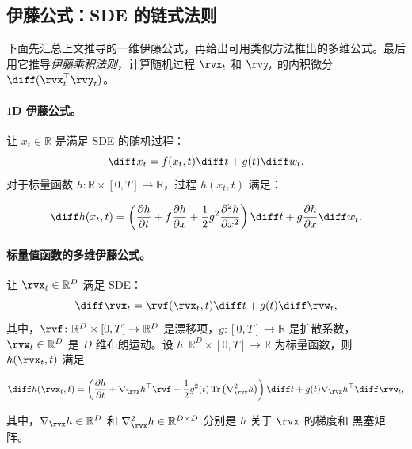 
\subsection{伊藤公式：SDE 的链式法则}
\label{subsec:ito-summary}
下面先汇总上文推导的一维伊藤公式，再给出可用类似方法推出的多维公式。最后用它推导\emph{伊藤乘积法则}，计算随机过程 $\rvx_t$ 和 $\rvy_t$ 的内积微分 $\diff(\rvx_t^\top \rvy_t)$。

\paragraph{$1$D 伊藤公式。}
让 $x_t \in \mathbb{R}$ 是满足 SDE 的随机过程：
\[
\diff x_t = f(x_t, t) \diff t + g(t) \diff w_t.
\]
对于标量函数 $h \colon \mathbb{R} \times [0, T] \to \mathbb{R}$，过程 $h(x_t, t)$ 满足：
\begin{mdframed}
\[
\diff h(x_t, t)
= \left( \frac{\partial h}{\partial t} + f \frac{\partial h}{\partial x}
+ \frac{1}{2} g^2 \frac{\partial^2 h}{\partial x^2} \right) \diff t
+ g \frac{\partial h}{\partial x} \diff w_t.
\]
\end{mdframed}


\paragraph{标量值函数的多维伊藤公式。}
让 $\rvx_t \in \mathbb{R}^D$ 满足 SDE：
\[
\diff \rvx_t = \rvf(\rvx_t, t) \diff t + g(t) \diff \rvw_t,
\]
其中，$\rvf \colon \mathbb{R}^D \times [0, T] \to \mathbb{R}^D$ 是漂移项，$g \colon [0, T] \to \mathbb{R}$ 是扩散系数，$\rvw_t \in \mathbb{R}^D$ 是 $D$ 维布朗运动。设 $h \colon \mathbb{R}^D \times [0, T] \to \mathbb{R}$ 为标量函数，则 $h(\rvx_t, t)$ 满足
\begin{mdframed}
\begin{align}\label{eq:Ito-scalar}
    \diff h(\rvx_t, t)
= \left( \frac{\partial h}{\partial t}
+ \nabla_{\rvx} h^\top \rvf
+ \frac{1}{2} g^2(t) \operatorname{Tr} \left( \nabla^2_{\rvx} h \right) \right) \diff t
+ g(t) \nabla_{\rvx} h^\top \diff \rvw_t,
\end{align}
\end{mdframed}
其中，$\nabla_{\rvx} h \in \mathbb{R}^D$ 和 $\nabla^2_{\rvx} h \in \mathbb{R}^{D \times D}$ 分别是 $h$ 关于 $\rvx$ 的梯度和 黑塞矩阵。


